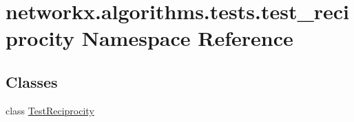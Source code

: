 \hypertarget{namespacenetworkx_1_1algorithms_1_1tests_1_1test__reciprocity}{}\section{networkx.\+algorithms.\+tests.\+test\+\_\+reciprocity Namespace Reference}
\label{namespacenetworkx_1_1algorithms_1_1tests_1_1test__reciprocity}
\subsection*{Classes}
\begin{DoxyCompactItemize}
\item 
class \hyperlink{classnetworkx_1_1algorithms_1_1tests_1_1test__reciprocity_1_1TestReciprocity}{Test\+Reciprocity}
\end{DoxyCompactItemize}
